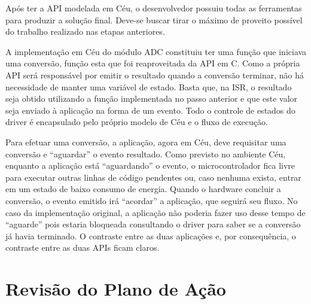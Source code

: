 \documentclass{article}
\begin{document}
\tab Após ter a API modelada em Céu, o desenvolvedor possuiu todas as ferramentas para produzir a
solução final. Deve-se buscar tirar o máximo de proveito possível do trabalho realizado nas etapas
anteriores.
\par A implementação em Céu do módulo ADC constituiu ter uma função que iniciava uma conversão,
função esta que foi reaproveitada da API em C. Como a própria API será responsável por emitir o
resultado quando a conversão terminar, não há necessidade de manter uma variável de estado. Basta
que, na ISR, o resultado seja obtido utilizando a função implementada no passo anterior e que este
valor seja enviado à aplicação na forma de um evento. Todo o controle de estados do driver é
encapsulado pelo próprio modelo de Céu e o fluxo de execução.
\par Para efetuar uma conversão, a aplicação, agora em Céu, deve requisitar uma conversão e “aguardar”
o evento resultado. Como previsto no ambiente Céu, enquanto a aplicação está “aguardando” o
evento, o microcontrolador fica livre para executar outras linhas de código pendentes ou, caso
nenhuma exista, entrar em um estado de baixo consumo de energia. Quando o hardware concluir a
conversão, o evento emitido irá “acordar” a aplicação, que seguirá seu fluxo. No caso da
implementação original, a aplicação não poderia fazer uso desse tempo de “aguarde” pois estaria
bloqueada consultando o driver para saber se a conversão já havia terminado. O contraste entre as
duas aplicações e, por consequência, o contraste entre as duas APIs ficam claros.

\section{Revisão do Plano de Ação}
\end{document}
